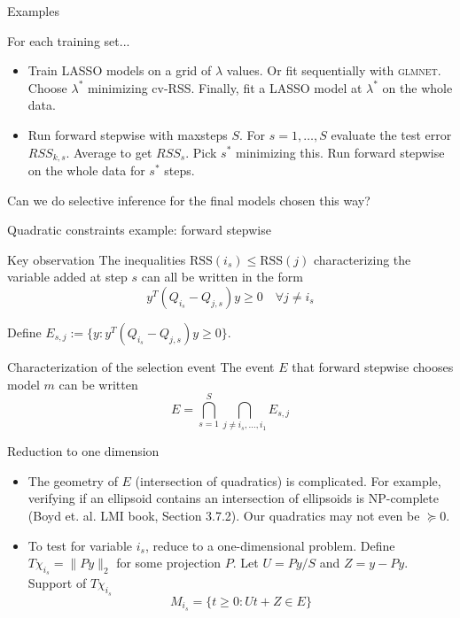 \documentclass{beamer}
\begin{document}
\begin{frame}{Examples}
  
  For each training set...

  \begin{itemize}

  \item Train LASSO models on a grid of $\lambda$ values. Or fit
    sequentially with \textsc{glmnet}. Choose $\lambda^*$ minimizing
    cv-RSS. Finally, fit a LASSO model at $\lambda^*$ on the
    whole data. 

  \item Run forward stepwise with maxsteps $S$. For $s = 1,\ldots,
    S$ evaluate the test error $RSS_{k,s}$. Average to
    get $RSS_s$. Pick $s^*$ minimizing this. Run forward stepwise on the
    whole data for $s^*$ steps. 

  \end{itemize}

  Can we do selective inference for the final models chosen this way?

\end{frame}

\begin{frame}{Quadratic constraints example: forward stepwise}

  \begin{block}{Key observation}
    The inequalities $\text{RSS}(i_s) \leq \text{RSS}(j)$ characterizing the variable added at step $s$ can all be written in the form
    \[
    y^T(Q_{i_s} - Q_{j,s})y \geq 0 \quad \forall j \neq i_s
    \]
  \end{block}

  
  Define $E_{s,j} := \{ y : y^T (Q_{i_s} - Q_{j,s} )y \geq 0 \}$.
  
  \begin{block}{Characterization of the selection event}
    The event $E$ that forward stepwise chooses model $m$ can be
    written
    \[
      E = \bigcap_{s=1}^S \bigcap_{j \neq i_s, \ldots, i_1} E_{s,j}
    \]
  \end{block}

\end{frame}

\begin{frame}{Reduction to one dimension}
  
  \begin{itemize}

  \item The geometry of $E$ (intersection of quadratics) is
    complicated. For example, verifying if an ellipsoid contains an
    intersection of ellipsoids is NP-complete (Boyd et. al. LMI
    book, Section 3.7.2). Our quadratics may not even be $\succeq 0$. 

  \item To test for variable $i_s$, reduce to a one-dimensional
    problem. Define $T\chi_{i_s} = \| P y \|_2$ for some projection
    $P$. Let $U = Py/S$ and $Z = y-Py$. Support of $T\chi_{i_s}$
    \[
    M_{i_s} = \{ t \geq 0 : Ut+Z \in E \}
    \] 

  \end{itemize}

\end{frame}
\end{document}
